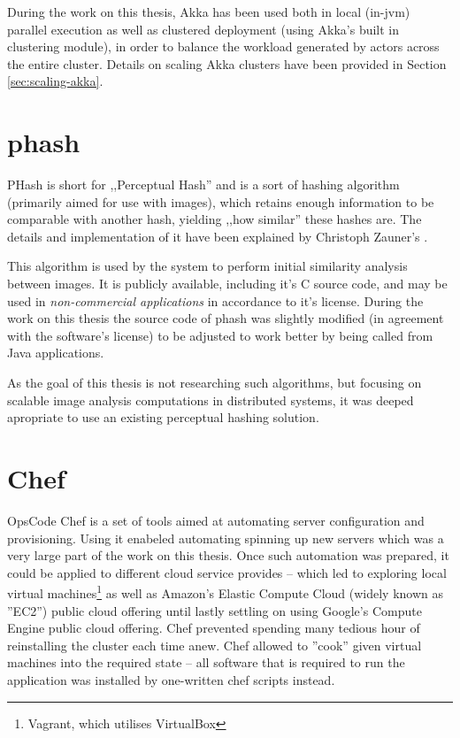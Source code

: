 During the work on this thesis, Akka has been used both in local (in-jvm) parallel execution as well as clustered deployment (using Akka's built in clustering module), in order to balance the workload generated by actors across the entire cluster. Details on scaling Akka clusters have been provided in Section \ref{sec:scaling-akka}.

\section{phash}
\label{sec:phash}
PHash is short for ,,Perceptual Hash'' and is a sort of hashing algorithm (primarily aimed for use with images), which retains enough information to be comparable with another hash, yielding ,,how similar'' these hashes are. The details and implementation of it have been explained by Christoph Zauner's \cite{phash}.

This algorithm is used by the system to perform initial similarity analysis between images. It is publicly available, including it's C source code, and may be used in \textit{non-commercial applications} in accordance to it's license. During the work on this thesis the source code of phash was slightly modified (in agreement with the software's license) to be adjusted to work better by being called from Java applications.

As the goal of this thesis is not researching such algorithms, but focusing on scalable image analysis computations in distributed systems, it was deeped apropriate to use an existing perceptual hashing solution.

\section{Chef}
\label{sec:chef}
OpsCode Chef is a set of tools aimed at automating server configuration and provisioning. Using it enabeled automating spinning up new servers which was a very large part of the work on this thesis. Once such automation was prepared, it could     be applied to different cloud service provides -- which led to exploring local virtual machines\footnote{Vagrant, which utilises VirtualBox} as well as Amazon's Elastic Compute Cloud (widely known as ''EC2'') public cloud offering until lastly settling on using Google's Compute Engine public cloud offering. Chef prevented spending many  tedious hour of reinstalling the cluster each time anew. Chef allowed to ''cook'' given virtual machines into the required state -- all software that is required to run the application was installed by one-written chef scripts instead.

